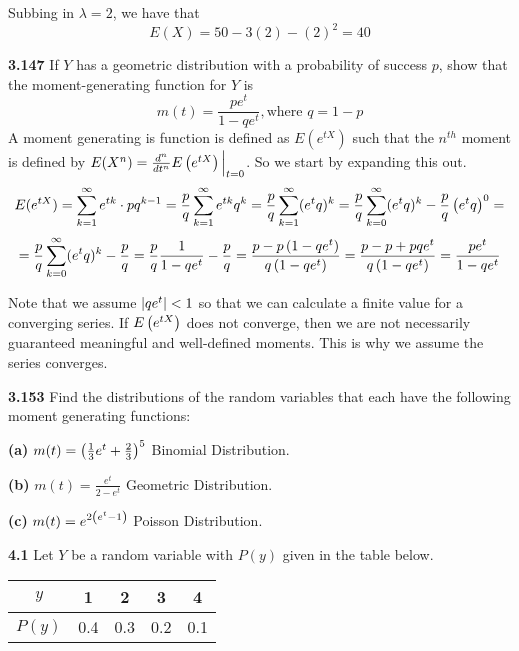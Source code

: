 \documentclass{exam}
\begin{document}
\begin{questions}
Subbing in $\lambda = 2$, we have that
$$E(X) = 50 - 3(2) - (2)^2 = 40$$

\newpage
\textbf{3.147 }
If $Y$ has a geometric distribution with a probability of success $p$, show that the moment-generating function for $Y$ is
$$m(t) = \frac{pe^t}{1 - qe^t}, \text{where }q = 1 - p$$
\sol
A moment generating is function is defined as $E(e^{tX})$ such that the $n^{th}$ moment is defined by 
\newline
$E(X^n) = \frac{d^n}{dt^n} E\left( e^{tX} \right)\Big|_{t = 0}$. So we start by expanding this out.
$$E(e^{tX}) = \sum_{k = 1}^\infty e^{tk} \cdot pq^{k - 1} = \frac{p}{q}\sum_{k = 1}^\infty e^{tk}q^k = \frac{p}{q}\sum_{k = 1}^\infty (e^tq)^k = \frac{p}{q}\sum_{k = 0}^\infty (e^tq)^k - \frac{p}{q}\left( e^tq \right)^0 =$$
$$= \frac{p}{q}\sum_{k = 0}^\infty (e^tq)^k - \frac{p}{q} = \frac{p}{q}\frac{1}{1 - qe^t} - \frac{p}{q} = \frac{p - p\left( 1 - qe^t \right)}{q\left( 1 - qe^t \right)} = \frac{p - p + pqe^t}{q\left( 1 - qe^t \right)} = \frac{pe^t}{1 - qe^t}$$

Note that we assume $\left| qe^t \right| < 1$ so that we can calculate a finite value for a converging series. If $E\left( e^{tX} \right)$ does not converge, then we are not necessarily guaranteed meaningful and well-defined moments. This is why we assume the series converges.

\newpage

\textbf{3.153 }
Find the distributions of the random variables that each have the following moment generating functions:

\newline
\textbf{(a) }$m(t) = \left( \frac{1}{3}e^t + \frac{2}{3} \right)^5$
\sol
Binomial Distribution.

\newline
\textbf{(b) }$m(t) = \frac{e^t}{2 - e^t}$
\sol
Geometric Distribution.

\newline
\textbf{(c) }$m(t) = e^{2\left( e^t - 1 \right)}$
\sol
Poisson Distribution.


\newpage
\textbf{4.1 }
Let $Y$ be a random variable with $P(y)$ given in the table below.

\newline
\begin{tabular}{c|cccc}
    $y$ & 1 & 2 & 3 & 4 \\
    \hline
    $P(y) $ & 0.4 & 0.3 & 0.2 & 0.1 \\
\end{tabular}
\newline


\end{questions}
\end{document}
